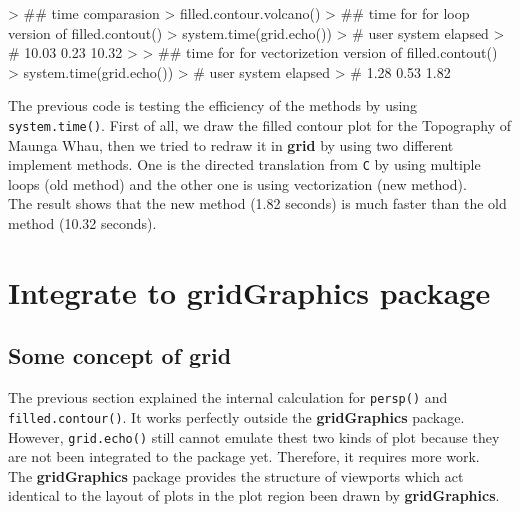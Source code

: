 \documentclass[paper=a4, fontsize=11pt]{report}
\begin{document}
\begin{Schunk}
\begin{Sinput}
> ## time comparasion
> filled.contour.volcano()
> ## time for for loop version of filled.contout()
> system.time(grid.echo())
> # user  system elapsed 
> # 10.03    0.23   10.32 
> 
> ## time for for vectorizetion version of filled.contout()
> system.time(grid.echo())
> # user  system elapsed 
> # 1.28    0.53    1.82 
\end{Sinput}
\end{Schunk}


	The previous code is testing the efficiency of the methods by using \texttt{system.time()}. First of all, we draw the filled contour plot for the Topography of Maunga Whau, then we tried to redraw it in \textbf{grid} by using two different implement methods. One is the directed translation from \texttt{C} by using multiple loops (old method) and the other one is using vectorization  (new method).\\
	The result shows that the new method (1.82 seconds) is much faster than the old method (10.32 seconds).

\chapter{Integrate to \textbf{gridGraphics} package}
\section{Some concept of \textbf{grid}}
The previous section explained the internal calculation for \texttt{persp()} and \texttt{filled.contour()}. It works perfectly outside the \textbf{gridGraphics} package. However, \texttt{grid.echo()} still cannot emulate thest two kinds of plot because they are not been integrated to the package yet. Therefore, it requires more work.\\ 

The \textbf{gridGraphics} package provides the structure of viewports which act identical to the layout of plots in the plot region been drawn by \textbf{gridGraphics}. 
\end{document}
